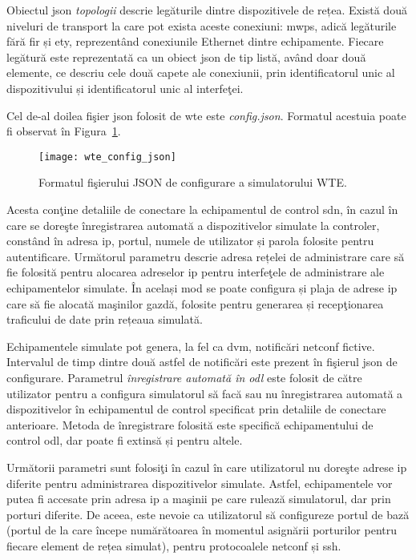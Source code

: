 Obiectul \gls{json} \textit{topologii} descrie legăturile dintre dispozitivele de rețea. Există două niveluri de transport la care pot exista aceste conexiuni: \gls{mwps}, adică legăturile fără fir și \gls{ety}, reprezentând conexiunile Ethernet dintre echipamente. Fiecare legătură este reprezentată ca un obiect \gls{json} de tip listă, având doar două elemente, ce descriu cele două capete ale conexiunii, prin identificatorul unic al dispozitivului și identificatorul unic al interfeţei.

Cel de-al doilea fişier \gls{json} folosit de \gls{wte} este \textit{config.json}. Formatul acestuia poate fi observat în Figura~\ref{fig:wte_config_json}.

\begin{figure}[h]
	\centering
	\texttt{[image: wte\_config\_json]}
	\caption{Formatul fişierului JSON de configurare a simulatorului WTE.}
	\label{fig:wte_config_json}
\end{figure}

Acesta conţine detaliile de conectare la echipamentul de control \gls{sdn}, în cazul în care se doreşte înregistrarea automată a dispozitivelor simulate la controler, constând în adresa \gls{ip}, portul, numele de utilizator și parola folosite pentru autentificare. Următorul parametru descrie adresa rețelei de administrare care să fie folosită pentru alocarea adreselor \gls{ip} pentru interfeţele de administrare ale echipamentelor simulate. În același mod se poate configura și plaja de adrese \gls{ip} care să fie alocată maşinilor gazdă, folosite pentru generarea și recepţionarea traficului de date prin rețeaua simulată. 

Echipamentele simulate pot genera, la fel ca \gls{dvm}, notificări \gls{netconf} fictive. Intervalul de timp dintre două astfel de notificări este prezent în fişierul \gls{json} de configurare. Parametrul \textit{înregistrare automată în \gls{odl}} este folosit de către utilizator pentru a configura simulatorul să facă sau nu înregistrarea automată a dispozitivelor în echipamentul de control specificat prin detaliile de conectare anterioare. Metoda de înregistrare folosită este specifică echipamentului de control \gls{odl}, dar poate fi extinsă și pentru altele.

Următorii parametri sunt folosiţi în cazul în care utilizatorul nu doreşte adrese \gls{ip} diferite pentru administrarea dispozitivelor simulate. Astfel, echipamentele vor putea fi accesate prin adresa \gls{ip} a maşinii pe care rulează simulatorul, dar prin porturi diferite. De aceea, este nevoie ca utilizatorul să configureze portul de bază (portul de la care începe numărătoarea în momentul asignării porturilor pentru fiecare element de rețea simulat), pentru protocoalele \gls{netconf} și \gls{ssh}.

